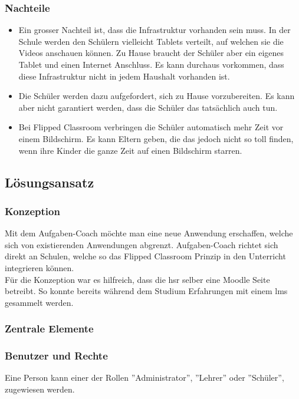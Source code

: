 \subsubsection*{Nachteile}
\begin{itemize}
	\item Ein grosser Nachteil ist, dass die Infrastruktur vorhanden sein muss. In der Schule werden den Schülern vielleicht Tablets verteilt, auf welchen sie die Videos anschauen können. Zu Hause braucht der Schüler aber ein eigenes Tablet und einen Internet Anschluss. Es kann durchaus vorkommen, dass diese Infrastruktur nicht in jedem Haushalt vorhanden ist.
	\item Die Schüler werden dazu aufgefordert, sich zu Hause vorzubereiten. Es kann aber nicht garantiert werden, dass die Schüler das tatsächlich auch tun.
	\item Bei Flipped Classroom verbringen die Schüler automatisch mehr Zeit vor einem Bildschirm. Es kann Eltern geben, die das jedoch nicht so toll finden, wenn ihre Kinder die ganze Zeit auf einen Bildschirm starren.
\end{itemize}

\subsection{Lösungsansatz}
\subsubsection{Konzeption}
Mit dem Aufgaben-Coach möchte man eine neue Anwendung erschaffen, welche sich von existierenden Anwendungen abgrenzt. Aufgaben-Coach richtet sich direkt an Schulen, welche so das Flipped Classroom Prinzip in den Unterricht integrieren können. \\

Für die Konzeption war es hilfreich, dass die \gls{hsr} selber eine Moodle Seite betreibt. So konnte bereits während dem Studium Erfahrungen mit einem \gls{lms} gesammelt werden.

\subsubsection{Zentrale Elemente}
\subsubsection*{Benutzer und Rechte}
Eine Person kann einer der Rollen ''Administrator'', ''Lehrer'' oder ''Schüler'', zugewiesen werden. \\

